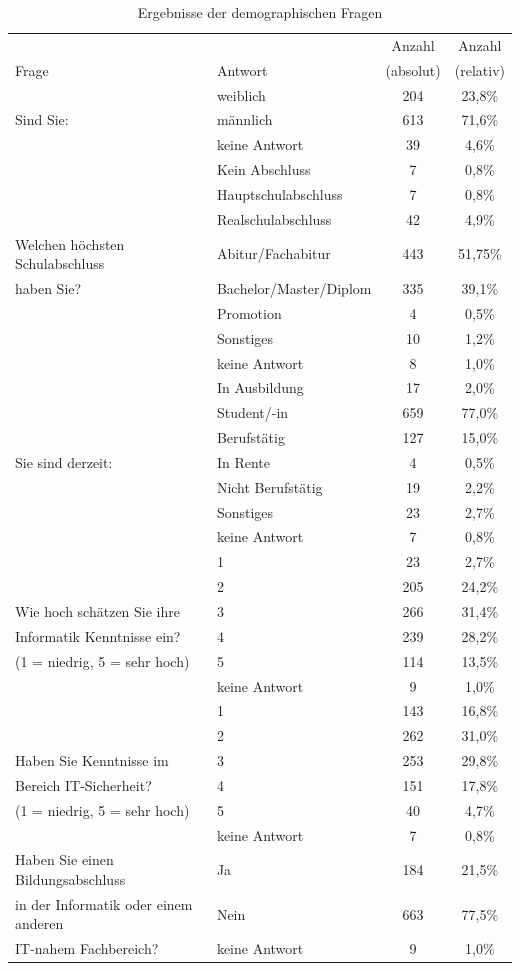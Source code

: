 \begin{table}
	\begin{tabular}[]{ l | l | c | c }
	\hline
	& & Anzahl & Anzahl \\
	Frage & Antwort & (absolut) & (relativ) \\
	\hline
	& weiblich &  204 & 23,8\% \\
	Sind Sie:& männlich & 613 & 71,6\% \\
	& keine Antwort & 39 & 4,6\% \\
	\hline \hline
	& Kein Abschluss & 7 & 0,8\% \\
	& Hauptschulabschluss & 7 & 0,8\% \\
	& Realschulabschluss & 42 & 4,9\% \\
	Welchen höchsten Schulabschluss& Abitur/Fachabitur & 443 & 51,75\% \\
	haben Sie? & Bachelor/Master/Diplom & 335 & 39,1\% \\
	& Promotion & 4 & 0,5\% \\
	& Sonstiges & 10 & 1,2\% \\
	& keine Antwort & 8 & 1,0\% \\
	\hline \hline
	& In Ausbildung & 17 & 2,0\% \\
	& Student/-in & 659 & 77,0\% \\
	& Berufstätig & 127 & 15,0\%\\
	Sie sind derzeit: & In Rente & 4 & 0,5\% \\
	& Nicht Berufstätig & 19 & 2,2\% \\
	& Sonstiges & 23 & 2,7\% \\
	& keine Antwort & 7 & 0,8\% \\
	\hline \hline
	& 1 & 23 & 2,7\%\\
	& 2 & 205 & 24,2\% \\
	Wie hoch schätzen Sie ihre & 3 & 266 & 31,4\% \\
	Informatik Kenntnisse ein? & 4 & 239 & 28,2\% \\
	(1 = niedrig, 5 = sehr hoch)& 5 & 114 & 13,5\% \\
	& keine Antwort & 9 & 1,0\% \\
	\hline \hline
	& 1 & 143 & 16,8\% \\
	& 2 & 262 & 31,0\% \\
	Haben Sie Kenntnisse im& 3 & 253 & 29,8\% \\
	Bereich IT-Sicherheit?& 4 & 151 & 17,8\% \\
	(1 = niedrig, 5 = sehr hoch)& 5 & 40 & 4,7\% \\
	& keine Antwort & 7 & 0,8\% \\
	\hline \hline
	Haben Sie einen Bildungsabschluss & Ja & 184 & 21,5\% \\
	in der Informatik oder einem anderen & Nein & 663 & 77,5\%\\
	IT-nahem Fachbereich? & keine Antwort & 9 & 1,0\% \\
	\hline
	\end{tabular}
	\caption{Ergebnisse der demographischen Fragen}\label{demoqna}
\end{table}

